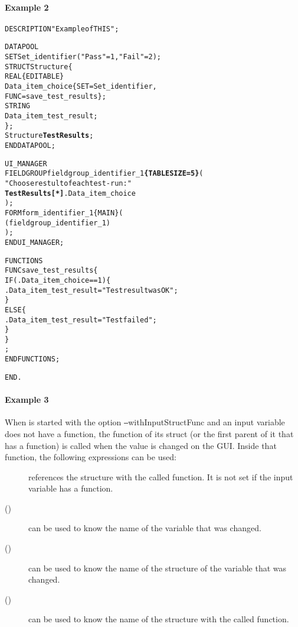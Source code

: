 \newpage
\paragraph*{Example 2}
\label{fuexample2}

\begin{boxedminipage}[t]{\linewidth}
\begin{alltt}

DESCRIPTION "Example of THIS";

DATAPOOL
  SET Set_identifier ("Pass" = 1, "Fail" = 2 );
  STRUCT Structure \{
    REAL \{EDITABLE\}
      Data_item_choice \{ SET = Set_identifier,
                         FUNC = save_test_results \};
    STRING
      Data_item_test_result;
  \};
  Structure {\bfseries TestResults} ;
END DATAPOOL;

UI_MANAGER
  FIELDGROUP fieldgroup_identifier_1{\bfseries  \{TABLESIZE=5\}} (
    "Choose restult of each test-run:"
    {\bfseries TestResults [*] }.Data_item_choice
  );
  FORM form_identifier_1 \{MAIN\} (
    ( fieldgroup_identifier_1 )
  );
END UI_MANAGER;

FUNCTIONS
  FUNC save_test_results \{
    IF ( \THIS.Data_item_choice == 1 ) \{
      \THIS.Data_item_test_result = "Test result was OK";
    \}
    ELSE \{
      \THIS.Data_item_test_result = "Test failed";
    \}
  \}
;
END FUNCTIONS;

END.
\end{alltt}
\end{boxedminipage}

\newpage
\paragraph*{Example 3}
\label{fuexample3}

When \INTENS{} is started with the option \texttt{--}withInputStructFunc
and an input variable does not have a function, the function
of its struct (or the first parent of it that has a function)
is called when the value is changed on the GUI. Inside that
function, the following expressions can be used:

\begin{description}
\item[\BASE] references the structure with the called function.
It is not set if the input variable has a function.

\item[\NODE(\INPUT)] can be used to know the name of the variable that was changed.

\item[\NODE(\THIS)] can be used to know the name of the structure of the variable that was changed.

\item[\NODE(\BASE)] can be used to know the name of the structure with the called function.
\end{description}

